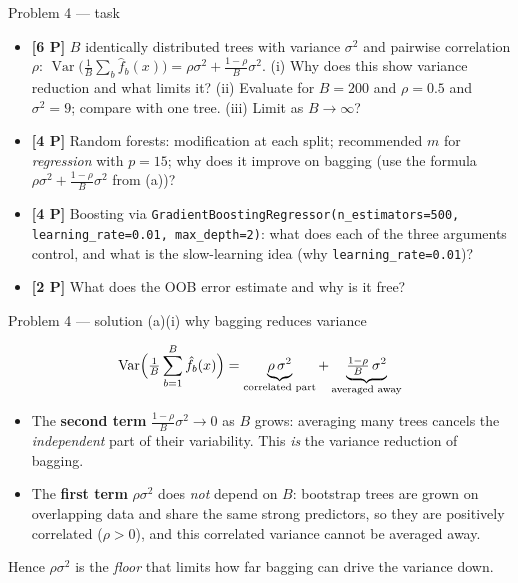 \documentclass[aspectratio=169,11pt]{beamer}
\begin{document}
\begin{frame}{Problem 4 --- task}
  \begin{exercise}
    \begin{itemize}
      \item[(a)] \textbf{[6 P]} $B$ identically distributed trees with variance $\sigma^2$ and
        pairwise correlation $\rho$:
        $\operatorname{Var}\bigl(\frac1B\sum_b\hat f_b(x)\bigr)=\rho\sigma^2+\frac{1-\rho}{B}\sigma^2$.
        (i) Why does this show variance reduction and what limits it?
        (ii) Evaluate for $B=200$ and $\rho=0.5$ and $\sigma^2=9$; compare with one tree.
        (iii) Limit as $B\to\infty$?
      \item[(b)] \textbf{[4 P]} Random forests: modification at each split; recommended $m$
        for \emph{regression} with $p=15$; why does it improve on bagging (use the formula
        $\rho\sigma^2+\frac{1-\rho}{B}\sigma^2$ from (a))?
      \item[(c)] \textbf{[4 P]} Boosting via
        \texttt{\small GradientBoostingRegressor(n\_estimators=500, learning\_rate=0.01,
        max\_depth=2)}: what does each of the three arguments control, and what is the
        slow-learning idea (why \texttt{learning\_rate=0.01})?
      \item[(d)] \textbf{[2 P]} What does the OOB error estimate and why is it free?
    \end{itemize}
  \end{exercise}
  \vspace{2pt}{\scriptsize\itshape Lecture slides: Chapter 8 --- Tree-Based Methods (Lecture 10).}
\end{frame}

\begin{frame}{Problem 4 --- solution (a)(i) why bagging reduces variance}
  \begin{solutionbox}
    \[
      \operatorname{Var}\Bigl(\tfrac1B\sum_{b=1}^{B}\hat f_b(x)\Bigr)
      =\underbrace{\rho\,\sigma^2}_{\text{correlated part}}
      +\underbrace{\tfrac{1-\rho}{B}\,\sigma^2}_{\text{averaged away}}
    \]
    \begin{itemize}
      \item The \textbf{second term} $\frac{1-\rho}{B}\sigma^2\to0$ as $B$ grows: averaging many
        trees cancels the \emph{independent} part of their variability. This \emph{is} the
        variance reduction of bagging.
      \item The \textbf{first term} $\rho\sigma^2$ does \emph{not} depend on $B$: bootstrap trees
        are grown on overlapping data and share the same strong predictors, so they are
        positively correlated ($\rho>0$), and this correlated variance cannot be averaged away.
    \end{itemize}
    Hence $\rho\sigma^2$ is the \emph{floor} that limits how far bagging can drive the variance
    down.
  \end{solutionbox}
\end{frame}
\end{document}
